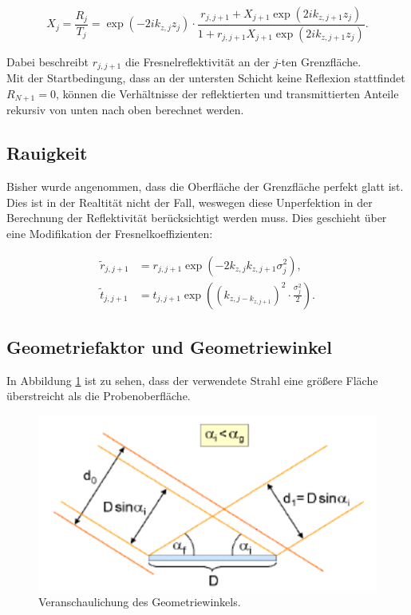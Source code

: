 \begin{equation*}
    X_j = \frac{R_j}{T_j} = \exp{\left(-2ik_{z,j}z_j\right)}\cdot \frac{r_{j,j+1}+X_{j+1}\exp{\left(2ik_{z,j+1}z_j\right)}}{1+r_{j,j+1}X_{j+1}\exp{\left(2ik_{z,j+1}z_j\right)}}.
\end{equation*}

Dabei beschreibt $r_{j,j+1}$ die Fresnelreflektivität an der $j$-ten Grenzfläche.\\
Mit der Startbedingung, dass an der untersten Schicht keine Reflexion stattfindet $R_{N+1} = 0$, können die Verhältnisse der
reflektierten und transmittierten Anteile rekursiv von unten nach oben berechnet werden.

\subsection{Rauigkeit}

Bisher wurde angenommen, dass die Oberfläche der Grenzfläche perfekt glatt ist. Dies ist in der Realtität nicht der Fall, 
weswegen diese Unperfektion in der Berechnung der Reflektivität berücksichtigt werden muss. Dies geschieht über eine 
Modifikation der Fresnelkoeffizienten:

\begin{align*}
    \tilde{r}_{j,j+1} &= r_{j,j+1} \exp{\left(-2k_{z,j}k_{z,j+1}\sigma_j^2\right)},\\
    \tilde{t}_{j,j+1} &= t_{j,j+1} \exp{\left(\left(k_{z,j-k_{z,j+1}}\right)^2\cdot\frac{\sigma_j^2}{2}\right)}.
\end{align*}

\subsection{Geometriefaktor und Geometriewinkel}

In Abbildung \ref{fig:geo} ist zu sehen, dass der verwendete Strahl eine größere Fläche überstreicht als die Probenoberfläche. 

\begin{figure}
  \centering
  \includegraphics[scale=0.5]{content/geo.png}
  \caption{Veranschaulichung des Geometriewinkels.\cite{Anleitung}}
  \label{fig:geo}
\end{figure} 


